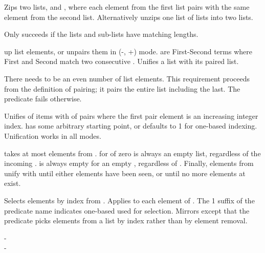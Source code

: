 \begin{description}
Zips two lists,  and , where each element from the first
list pairs with the same element from the second list. Alternatively
unzips one list of lists into two lists.

Only succeeds if the lists and sub-lists have matching lengths.

 up list elements, or unpairs them in (-, +) mode.  are
First-Second terms where First and Second match two consecutive
. Unifies a list with its paired list.

There needs to be an even number of list elements. This requirement
proceeds from the definition of pairing; it pairs the entire list
including the last. The predicate fails otherwise.

\nodescription
Unifies  of items with  of pairs where the first pair
element is an increasing integer index.  has some arbitrary
starting point, or defaults to 1 for one-based indexing. Unification
works in all modes.

 takes at most  elements from .  for  of
zero is always an empty list, regardless of the incoming . 
is always empty for an empty , regardless of . Finally,
elements from  unify with  until either  elements
have been seen, or until no more elements at  exist.

Selects  elements by index from . Applies  to each
element of . The 1 suffix of the predicate name indicates
one-based  used for selection. Mirrors  except that
the predicate picks elements from a list by index rather than by
element removal.

\begin{tags}
-  \\- 
\end{tags}


\end{description}
